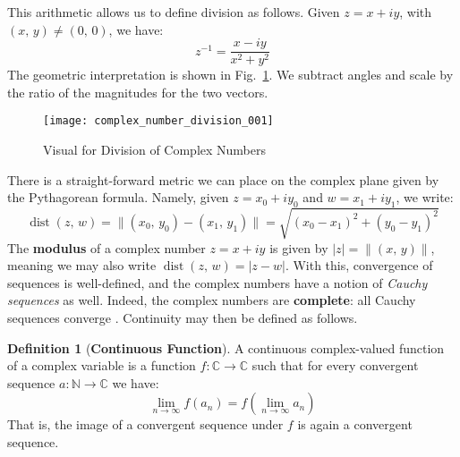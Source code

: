 \documentclass{article}
\theoremstyle{definition}
\newtheorem{definition}{Definition}[section]
\begin{document}
        This arithmetic allows us to define division as follows.
        Given $z=x+iy$, with $(x,\,y)\ne(0,\,0)$, we have:
        \begin{equation}
            z^{-1}=\frac{x-iy}{x^{2}+y^{2}}
        \end{equation}
        The geometric interpretation is shown in
        Fig.~\ref{fig:complex_number_division_001}. We subtract angles and
        scale by the ratio of the magnitudes for the two vectors.
        \begin{figure}
            \centering
            \texttt{[image: complex\_number\_division\_001]}
            \caption{Visual for Division of Complex Numbers}
            \label{fig:complex_number_division_001}
        \end{figure}
        There is a straight-forward metric we can place on the complex plane
        given by the Pythagorean formula. Namely, given
        $z=x_{0}+iy_{0}$ and $w=x_{1}+iy_{1}$, we write:
        \begin{equation}
            \operatorname{dist}(z,\,w)
            =\|(x_{0},\,y_{0})-(x_{1},\,y_{1})\|
            =\sqrt{(x_{0}-x_{1})^{2}+(y_{0}-y_{1})^{2}}
        \end{equation}
        The \textbf{modulus} of a complex number $z=x+iy$ is given by
        $|z|=\|(x,\,y)\|$, meaning we may also write
        $\operatorname{dist}(z,\,w)=|z-w|$. With this, convergence of sequences
        is well-defined, and the complex numbers have a notion of
        \textit{Cauchy sequences} as well. Indeed, the complex numbers are
        \textbf{complete}: all Cauchy sequences converge
        \cite[p.~33]{AlhforsComplexAnalysis}. Continuity may then be defined
        as follows.
        \begin{definition}[\textbf{Continuous Function}]
            A continuous complex-valued function of a complex variable is a
            function $f:\mathbb{C}\rightarrow\mathbb{C}$ such that for every
            convergent sequence $a:\mathbb{N}\rightarrow\mathbb{C}$ we have:
            \begin{equation}
                \lim_{n\rightarrow\infty}f(a_{n})
                =f\left(\lim_{n\rightarrow\infty}a_{n}\right)
            \end{equation}
            That is, the image of a convergent sequence under $f$ is again a
            convergent sequence.
        \end{definition}
\end{document}
